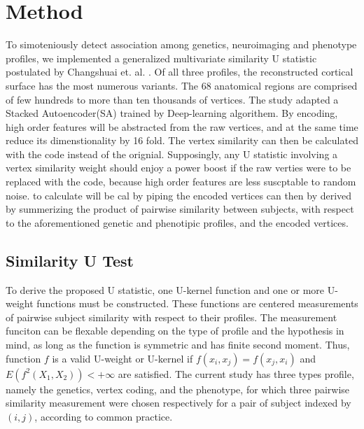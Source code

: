 \section{Method}

To simoteniously detect association among genetics, neuroimaging and phenotype profiles, we implemented a generalized multivariate similarity U statistic postulated by Changshuai et. al. \cite{HWU}. Of all three profiles, the reconstructed cortical surface has the most numerous variants. The 68 anatomical regions are comprised of few hundreds to more than ten thousands of vertices. The study adapted a Stacked Autoencoder(SA) trained by Deep-learning algorithem. By encoding, high order features will be abstracted from the raw vertices, and at the same time reduce its dimenstionality by 16 fold. The vertex similarity can then be calculated with the code instead of the orignial. Supposingly, any U statistic involving a vertex similarity weight should enjoy a power boost if the raw verties were to be replaced with the code, because high order features are less suscptable to random noise. to calculate will be cal by piping the encoded vertices can then by derived by summerizing the product of pairwise similarity between subjects, with respect to the aforementioned genetic and phenotipic profiles, and the encoded vertices. 


\subsection{Similarity U Test}
  To derive the proposed U statistic, one U-kernel function and one or more U-weight functions must be constructed. These functions are centered measurements of pairwise subject similarity with respect to their profiles. The measurement funciton can be flexable depending on the type of profile and the hypothesis in mind, as long as the function is symmetric and has finite second moment. Thus, function $f$ is a valid U-weight or U-kernel if $f(x_i,x_j)=f(x_j,x_i)$ and $E(f^2(X_1, X_2))<+\infty$ are satisfied. The current study has three types profile, namely the genetics, vertex coding, and the phenotype, for which three pairwise similarity measurement were chosen respectively for a pair of subject indexed by $(i,j)$, according to common practice.

